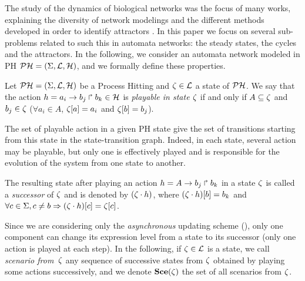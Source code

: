 The study of the dynamics of biological networks was the focus of many works, explaining the diversity of network modelings and the different methods developed in order to identify attractors \cite{skodawessely2011finding, zhang2007algorithms, mushthofa2014asp, akutsu2012finding, berntenis2013detection}.
In this paper we focus on several sub-problems related to such this in automata networks: the steady states, the cycles and the attractors. %
In the following, we consider an automata network modeled in PH $\mathcal{PH}=(\Sigma,\mathcal{L},\mathcal{H})$,
and we formally define these properties.

\begin{definition} 
\label{def:playableAction}
Let $\mathcal{PH} = (\Sigma,\mathcal{L},\mathcal{H})$ be a Process Hitting and $\zeta \in \mathcal{L}$ a state of $\mathcal{PH}$.
We say that the action $h = a_i\rightarrow b_j\Rsh b_k \in \mathcal{H}$
is \emph{playable in state $\zeta$} if and only if
$A \subseteq \zeta$ and $b_j \in \zeta$ (\ie $\forall a_i \in A$, ${\zeta[a]} = a_i$ and ${\zeta[b]}=b_j$).
\end{definition}

The set of playable action in a given PH state give the set of transitions starting from this state in the state-transition graph.
Indeed, in each state, several action may be playable, but only one is effectively played and is responsible for the evolution of the system from one state to another.

\begin{definition}
The resulting state after playing an action $h= A\rightarrow b_j\Rsh b_k$ in a state $\zeta$
is called a \emph{successor} of $\zeta$ and
is denoted by $(\zeta \cdot h)$,
where ${(\zeta \cdot h)[b]} = b_k$ and
$\forall c \in \Sigma, c \neq b \Rightarrow {(\zeta\cdot h)[c]}={\zeta[c]}$.
\end{definition}

Since we are considering only the \emph{asynchronous} updating scheme (), only one component can change its expression level from a state to its successor (\ie only one action is played at each step). In the following, if $\zeta \in \mathcal{L}$ is a state,
we call \emph{scenario from~$\zeta$}
any sequence of successive states from $\zeta$
obtained by playing some actions successively,
and we denote $\mathbf{Sce}(\zeta)$ the set of all scenarios from $\zeta$.

